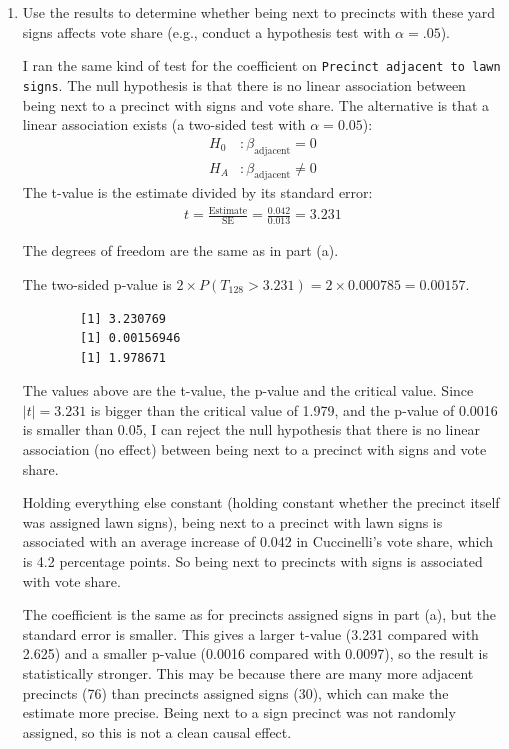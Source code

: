 \documentclass[12pt,letterpaper]{article}
\begin{document}
\begin{enumerate}
		\newpage		
		\item [(b)]  Use the results to determine whether being
		next to precincts with these yard signs affects vote
		share (e.g., conduct a hypothesis test with $\alpha = .05$).
		\vspace{.25cm}
		
		\noindent I ran the same kind of test for the coefficient on \texttt{Precinct adjacent to lawn signs}. The null hypothesis is that there is no linear association between being next to a precinct with signs and vote share. The alternative is that a linear association exists (a two-sided test with $\alpha = 0.05$):
	\begin{align*}
		H_0&: \beta_{\text{adjacent}} = 0 \\
		H_A&: \beta_{\text{adjacent}} \neq 0
	\end{align*}
		\noindent The t-value is the estimate divided by its standard error:
		\begin{align*}
			t = \frac{\text{Estimate}}{\text{SE}} = \frac{0.042}{0.013} = 3.231
		\end{align*}
		
		The degrees of freedom are the same as in part (a). 
		
		The two-sided p-value is $2 \times P(T_{128} > 3.231) = 2 \times 0.000785 = 0.00157$. 
		
	\begin{verbatim}
		[1] 3.230769
		[1] 0.00156946
		[1] 1.978671
	\end{verbatim}
		\noindent The values above are the t-value, the p-value and the critical value. Since $|t| = 3.231$ is bigger than the critical value of 1.979, and the p-value of 0.0016 is smaller than 0.05, I can reject the null hypothesis that there is no linear association (no effect) between being next to a precinct with signs and vote share. 
		\vspace{.25cm}
		
		\noindent Holding everything else constant (holding constant whether the precinct itself was assigned lawn signs), being next to a precinct with lawn signs is associated with an average increase of 0.042 in Cuccinelli's vote share, which is 4.2 percentage points. So being next to precincts with signs is associated with vote share.
		\vspace{.25cm}
		
		\noindent The coefficient is the same as for precincts assigned signs in part (a), but the standard error is smaller. This gives a larger t-value (3.231 compared with 2.625) and a smaller p-value (0.0016 compared with 0.0097), so the result is statistically stronger. This may be because there are many more adjacent precincts (76) than precincts assigned signs (30), which can make the estimate more precise. Being next to a sign precinct was not randomly assigned, so this is not a clean causal effect. 
		

\end{enumerate}
\end{document}
